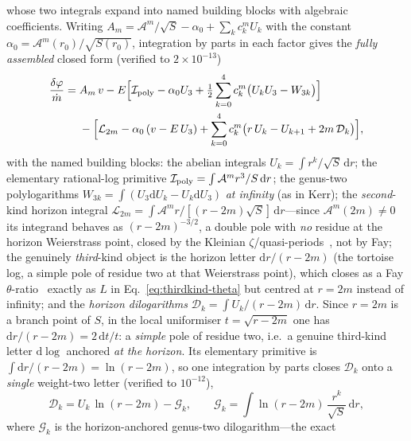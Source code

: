 \documentclass[12pt]{iopart}
\newcommand{\dd}{\mathrm{d}}
\begin{document}
whose two integrals expand into named building blocks with algebraic coefficients.
Writing $A_m=\mathcal{A}^m/\sqrt S-\alpha_0+\sum_k c_k^m U_k$ with the constant
$\alpha_0=\mathcal{A}^m(r_0)/\sqrt{S(r_0)}$, integration by parts in each factor gives
the \emph{fully assembled} closed form (verified to $2\times10^{-13}$)
\begin{equation}
\begin{aligned}
    \frac{\delta\varphi}{\dot m}
    ={}&A_m\,v
    -E\Big[\mathcal{I}_{\rm poly}-\alpha_0 U_3
        +\tfrac12\sum_{k=0}^4 c_k^m\big(U_kU_3-W_{3k}\big)\Big]\\
    &{}-\Big[\mathcal{L}_{2m}-\alpha_0\,(v-E\,U_3)
        +\sum_{k=0}^4 c_k^m\big(r\,U_k-U_{k+1}+2m\,\mathcal{D}_k\big)\Big],
\end{aligned}
    \label{eq:vaidya-full}
\end{equation}
with the named building blocks: the abelian integrals $U_k=\int r^k/\sqrt S\,\dd r$;
the elementary rational-log primitive
$\mathcal{I}_{\rm poly}=\int\mathcal{A}^m r^3/S\,\dd r$; the genus-two
polylogarithms $W_{3k}=\int(U_3\dd U_k-U_k\dd U_3)$ \emph{at infinity} (as in Kerr);
the \emph{second}-kind horizon integral
$\mathcal{L}_{2m}=\int\mathcal{A}^m r/[(r-2m)\sqrt S]\,\dd r$---since
$\mathcal{A}^m(2m)\ne0$ its integrand behaves as $(r-2m)^{-3/2}$, a double pole with
\emph{no} residue at the horizon Weierstrass point, closed by the Kleinian
$\zeta$/quasi-periods~\cite{BuchstaberEnolskii1997,BakerAbelian1897}, not by Fay; the
genuinely \emph{third}-kind object is the horizon letter $\dd r/(r-2m)$ (the tortoise
log, a simple pole of residue two at that Weierstrass point), which closes as a Fay
$\theta$-ratio~\cite{Fay1973} exactly as $L$ in Eq.~\eqref{eq:thirdkind-theta} but
centred at $r=2m$ instead of infinity; and
the \emph{horizon dilogarithms} $\mathcal{D}_k=\int U_k/(r-2m)\,\dd r$. Since $r=2m$
is a branch point of $S$, in the local uniformiser $t=\sqrt{r-2m}$ one has
$\dd r/(r-2m)=2\,\dd t/t$: a \emph{simple} pole of residue two, i.e.\ a genuine
third-kind letter $\dd\log$ anchored \emph{at the horizon}. Its elementary primitive
is $\int\dd r/(r-2m)=\ln(r-2m)$, so one integration by parts closes $\mathcal{D}_k$
onto a \emph{single} weight-two letter (verified to $10^{-12}$),
\begin{equation}
    \mathcal{D}_k=U_k\,\ln(r-2m)-\mathcal{G}_k,\qquad
    \mathcal{G}_k=\int\ln(r-2m)\,\frac{r^k}{\sqrt S}\,\dd r,
    \label{eq:horizon-dilog}
\end{equation}
where $\mathcal{G}_k$ is the horizon-anchored genus-two dilogarithm---the exact
\end{document}
